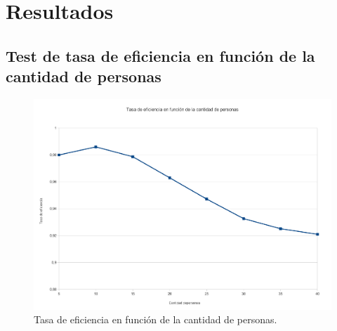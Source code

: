 \section{Resultados}
\subsection{Test de tasa de eficiencia en función de la cantidad de personas}
\begin{figure}[H]{}
\centering
\includegraphics[scale=0.5]{graphs/CPvsTE.pdf}
\caption{Tasa de eficiencia en función de la cantidad de personas.}
\label{CPvsTE}
\end{figure}


